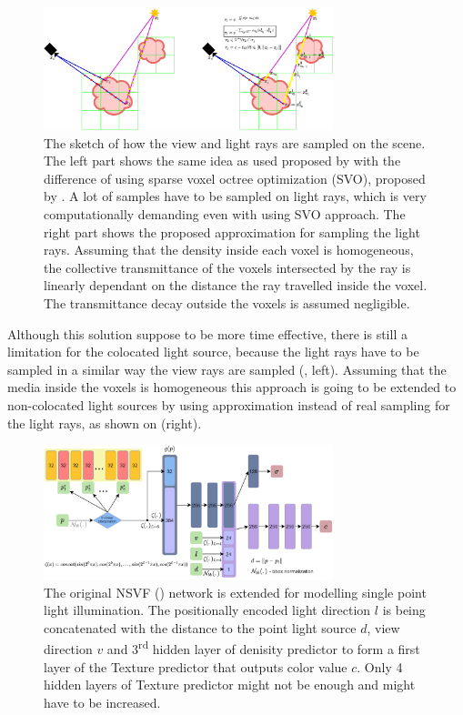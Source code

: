 \documentclass[english]{article}
\begin{document}
\begin{figure}[h]
    \centering
    \includegraphics[width=0.75\textwidth]{img/light_nrf_approx_both.png}
    \caption{The sketch of how the view and light rays are sampled on the scene. The left part shows the same idea as used proposed by \cite{nrf2020} with the difference of using sparse voxel octree optimization (SVO), proposed by \cite{nsvf2020}. A lot of samples have to be sampled on light rays, which is very computationally demanding even with using SVO approach. The right part shows the proposed approximation for sampling the light rays. Assuming that the density inside each voxel is homogeneous, the collective transmittance of the voxels intersected by the ray is linearly dependant on the distance the ray travelled inside the voxel. The transmittance decay outside the voxels is assumed negligible.}
    \label{fig:light_nrf_approx_both}
\end{figure}

Although this solution suppose to be more time effective, there is still a limitation for the colocated light source, because the light rays have to be sampled in a similar way the view rays are sampled (, left). Assuming that the media inside the voxels is homogeneous this approach is going to be extended to non-colocated light sources by using approximation instead of real sampling for the light rays, as shown on  (right).


\begin{figure}[h]
    \centering
    \includegraphics[width=0.75\textwidth]{img/mlp_nsvfnrf_implicit.png}
    \caption{The original NSVF (\cite{nsvf2020}) network is extended for modelling single point light illumination. The positionally encoded light direction $l$ is being concatenated with the distance to the point light source $d$, view direction $v$ and 3\textsuperscript{rd} hidden layer of denisity predictor to form a first layer of the Texture predictor that outputs color value $c$. Only 4 hidden layers of Texture predictor might not be enough and might have to be increased.}
    \label{fig:mlp_nsvfnrf_implicit}
\end{figure}
\end{document}
